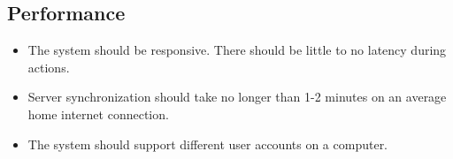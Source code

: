 \subsection*{Performance}
\begin{itemize}
	\item The system should be responsive. There should be little to no latency during actions.
	\item Server synchronization should take no longer than 1-2 minutes on an average home internet connection.
	\item The system should support different user accounts on a computer.
\end{itemize}
